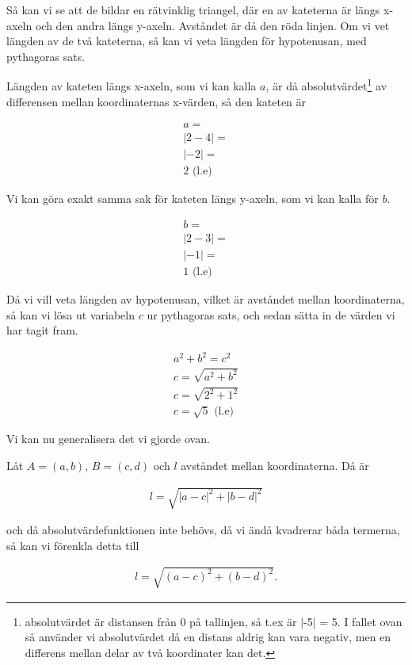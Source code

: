 Så kan vi se att de bildar en rätvinklig triangel, där en av kateterna är längs x-axeln och den andra längs y-axeln. Avståndet är då den röda linjen. Om vi vet längden av de två kateterna, så kan vi veta längden för hypotenusan, med pythagoras sats.

Längden av kateten längs x-axeln, som vi kan kalla $a$, är då absolutvärdet\footnote{absolutvärdet är distansen från $0$ på tallinjen, så t.ex är |-5| = 5. I fallet ovan så använder vi absolutvärdet då en distans aldrig kan vara negativ, men en differens mellan delar av två koordinater kan det.} av differensen mellan koordinaternas x-värden, så den kateten är

\begin{align}
	a = \\
	|2-4| = \\
	|-2| = \\
	2 \text{ (l.e)}
\end{align}

Vi kan göra exakt samma sak för kateten längs y-axeln, som vi kan kalla för $b$.

\begin{align}
	b = \\
	|2-3| = \\
	|-1| = \\
	1 \text{ (l.e)}
\end{align}

Då vi vill veta längden av hypotenusan, vilket är avståndet mellan koordinaterna, så kan vi lösa ut variabeln $c$ ur pythagoras sats, och sedan sätta in de värden vi har tagit fram.

\begin{align}
	a^2+b^2=c^2 \\
	c = \sqrt{a^2+b^2} \\
	c = \sqrt{2^2+1^2} \\
	c = \sqrt{5} \text{ (l.e)}
\end{align}

Vi kan nu generalisera det vi gjorde ovan. 

Låt $A=(a,b)$, $B=(c,d)$ och $l$  avståndet mellan koordinaterna. Då är

\begin{align}
	l = \sqrt{|a-c|^2+|b-d|^2}
\end{align}

och då absolutvärdefunktionen inte behövs, då vi ändå kvadrerar båda termerna, så kan vi förenkla detta till

\begin{align}
	l = \sqrt{(a-c)^2+(b-d)^2}.
\end{align}

